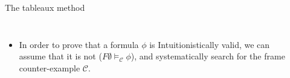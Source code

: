 \documentclass{beamer}
\begin{document}
\begin{frame}{The  tableaux method}

\begin{columns}
    \begin{itemize}
            \item In order to prove that a formula $\phi$ is Intuitionistically valid, we can assume that it is not ($F {\emptyset} \vDash_{\mathcal{C}} \phi$), and systematically search for the frame counter-example $\mathcal{C}$.



    \end{itemize}

    \rule{0.2mm}{\textheight} %


\end{columns}
\end{frame}
\end{document}
